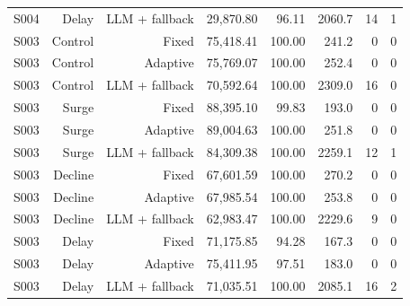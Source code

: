 \begin{tabular}{lrrrrrrr}
S004 & Delay & LLM + fallback & 29,870.80 & 96.11 & 2060.7 & 14 & 1 \\
S003 & Control & Fixed & 75,418.41 & 100.00 & 241.2 & 0 & 0 \\
S003 & Control & Adaptive & 75,769.07 & 100.00 & 252.4 & 0 & 0 \\
S003 & Control & LLM + fallback & 70,592.64 & 100.00 & 2309.0 & 16 & 0 \\
S003 & Surge & Fixed & 88,395.10 & 99.83 & 193.0 & 0 & 0 \\
S003 & Surge & Adaptive & 89,004.63 & 100.00 & 251.8 & 0 & 0 \\
S003 & Surge & LLM + fallback & 84,309.38 & 100.00 & 2259.1 & 12 & 1 \\
S003 & Decline & Fixed & 67,601.59 & 100.00 & 270.2 & 0 & 0 \\
S003 & Decline & Adaptive & 67,985.54 & 100.00 & 253.8 & 0 & 0 \\
S003 & Decline & LLM + fallback & 62,983.47 & 100.00 & 2229.6 & 9 & 0 \\
S003 & Delay & Fixed & 71,175.85 & 94.28 & 167.3 & 0 & 0 \\
S003 & Delay & Adaptive & 75,411.95 & 97.51 & 183.0 & 0 & 0 \\
S003 & Delay & LLM + fallback & 71,035.51 & 100.00 & 2085.1 & 16 & 2 \\
\bottomrule
\end{tabular}
